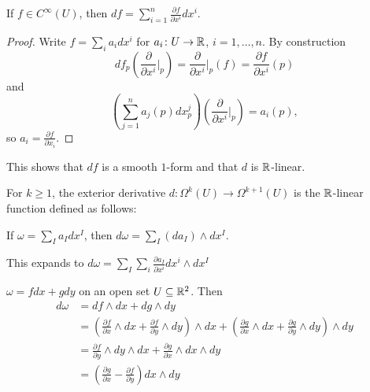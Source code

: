 \begin{frame}
  \begin{prop}
    If $f \in C^{\infty}(U)$, then $df = \sum_{i=1}^n 
    \frac{\partial f}{\partial x^i} dx^i$.
  \end{prop}
  \begin{proof}
    Write $f = \sum_i a_i dx^i$ for $a_i \colon U \to \mathbb R$, $i=1, \dots, n$.
    By construction
    \begin{displaymath}
      df_p(\frac{\partial}{\partial x^i}\vert_p) =
      \frac{\partial}{\partial x^i}\vert_p(f) =
      \frac{\partial f}{\partial x^i}(p)
    \end{displaymath}
    and
    \begin{displaymath}
      (\sum_{j=1}^n a_j(p) dx^j_p)(\frac{\partial}{\partial x^i}\vert_p)
      = a_i(p),
    \end{displaymath}
    so $a_i = \frac{\partial f}{\partial x_i}$.
  \end{proof}
  This shows that $df$ is a smooth $1$-form and that $d$ is $\mathbb R$-linear.
\end{frame}
\begin{frame}
  \begin{defn}
    For $k \ge 1$, the exterior derivative $d \colon \Omega^k(U) 
    \to \Omega^{k+1}(U)$ is the $\mathbb R$-linear function defined as follows:
    \begin{center}
      If $\omega = \sum_I a_I dx^I$, then $d\omega = \sum_I (da_I) \wedge dx^I$.
    \end{center}
  \end{defn}
  This expands to
  $
    d \omega = \sum_I \sum_i 
    \frac{\partial a_I}{\partial x^i} dx^i \wedge dx^I
    $
  \begin{example}
    $\omega = fdx + gdy$ on an open set $U \subseteq \mathbb R^2$.
    Then
    \begin{align*}
      d\omega &= df \wedge dx + dg \wedge dy \\
      &= 
      (
      \frac{\partial f}{\partial x} \wedge dx
      +
      \frac{\partial f}{\partial y} \wedge dy
      )
      \wedge dx
      +
      (
      \frac{\partial g}{\partial x} \wedge dx
      +
      \frac{\partial g}{\partial y} \wedge dy
      )
      \wedge dy \\
      &=
      \frac{\partial f}{\partial y} \wedge dy
      \wedge dx
      +
      \frac{\partial g}{\partial x} \wedge dx
      \wedge dy \\
      &=
      (
      \frac{\partial g}{\partial x}
      -
      \frac{\partial f}{\partial y}
      )
      dx \wedge dy
    \end{align*}
  \end{example}
\end{frame}
